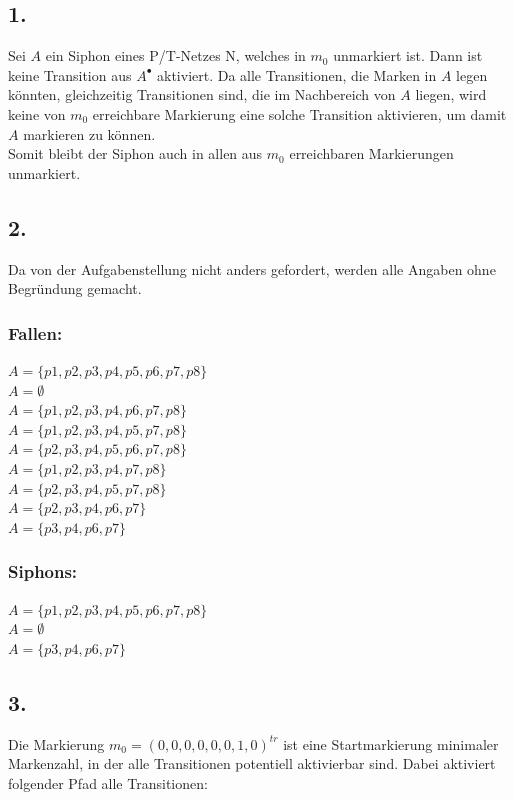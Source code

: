 \documentclass[12pt, paper=a4]{article}
\begin{document}
\subsection*{1.}
Sei \(A\) ein Siphon eines P/T-Netzes N, welches in \(m_0\) unmarkiert ist. Dann ist keine Transition aus \(A^{\bullet}\) aktiviert. Da alle Transitionen, die Marken in \(A\) legen k\"onnten, gleichzeitig Transitionen sind, die im Nachbereich von  \(A\) liegen, wird keine von \(m_0\) erreichbare Markierung eine solche Transition aktivieren, um damit \(A\) markieren zu k\"onnen.\\
Somit bleibt der Siphon auch in allen aus \(m_0\) erreichbaren Markierungen unmarkiert.

\subsection*{2.}
Da von der Aufgabenstellung nicht anders gefordert, werden alle Angaben ohne Begründung gemacht.
\subsubsection*{Fallen:}
$A=\{p1,p2,p3,p4,p5,p6,p7,p8\}$\\
$A=\emptyset$\\
$A=\{p1,p2,p3,p4,p6,p7,p8\}$\\
$A=\{p1,p2,p3,p4,p5,p7,p8\}$\\
$A=\{p2,p3,p4,p5,p6,p7,p8\}$\\
$A=\{p1,p2,p3,p4,p7,p8\}$\\
$A=\{p2,p3,p4,p5,p7,p8\}$\\
$A=\{p2,p3,p4,p6,p7\}$\\
$A=\{p3,p4,p6,p7\}$\\
\subsubsection*{Siphons:}
$A=\{p1,p2,p3,p4,p5,p6,p7,p8\}$\\
$A=\emptyset$\\
$A=\{p3,p4,p6,p7\}$\\

\subsection*{3.}
Die Markierung $m_0 = (0,0,0,0,0,0,1,0)^{tr}$ ist eine Startmarkierung minimaler Markenzahl, in der alle Transitionen potentiell aktivierbar sind. Dabei aktiviert folgender Pfad alle Transitionen:\\
\end{document}
